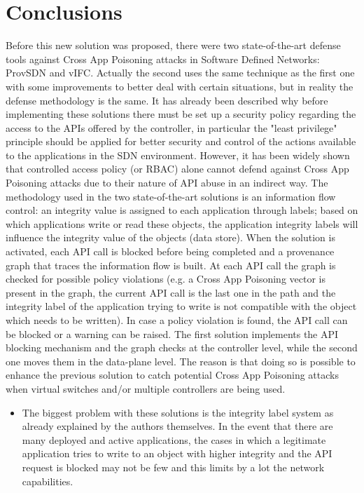 {\section{Conclusions}
Before this new solution was proposed, there were two state-of-the-art defense tools against Cross App Poisoning attacks in Software Defined Networks: ProvSDN and vIFC. Actually the second uses the same technique as the first one with some improvements to better deal with certain situations, but in reality the defense methodology is the same. It has already been described why before implementing these solutions there must be set up a security policy regarding the access to the APIs offered by the controller, in particular the "least privilege" principle should be applied for better security and control of the actions available to the applications in the SDN environment. However, it has been widely shown that controlled access policy (or RBAC) alone cannot defend against Cross App Poisoning attacks due to their nature of API abuse in an indirect way. The methodology used in the two state-of-the-art solutions is an information flow control: an integrity value is assigned to each application through labels; based on which applications write or read these objects, the application integrity labels will influence the integrity value of the objects (data store). When the solution is activated, each API call is blocked before being completed and a provenance graph that traces the information flow is built. At each API call the graph is checked for possible policy violations (e.g. a Cross App Poisoning vector is present in the graph, the current API call is the last one in the path and the integrity label of the application trying to write is not compatible with the object which needs to be written). In case a policy violation is found, the API call can be blocked or a warning can be raised. The first solution implements the API blocking mechanism and the graph checks at the controller level, while the second one moves them in the data-plane level. The reason is that doing so is possible to enhance the previous solution to catch potential Cross App Poisoning attacks when virtual switches and/or multiple controllers are being used. 
\begin{itemize}
\item The biggest problem with these solutions is the integrity label system as already explained by the authors themselves. In the event that there are many deployed and active applications, the cases in which a legitimate application tries to write to an object with higher integrity and the API request is blocked may not be few and this limits by a lot the network capabilities.

\end{itemize}}

